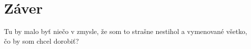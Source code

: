 \cleardoublepage
{}
{}
\chapter*{Záver}\label{chap:zaver}
Tu by malo byť niečo v zmysle, že som to strašne nestihol a vymenované všetko, čo by som chcel dorobiť?

\backmatter

\cleardoublepage
{}
{}
% 
% 
% 
% 

\printbibliography
